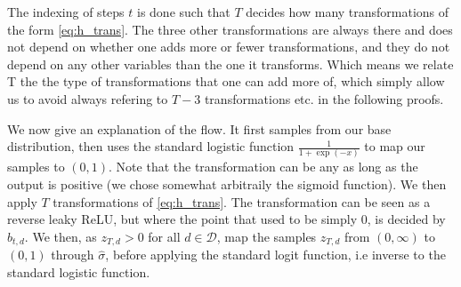 The indexing of steps \(t\) is done such
that \(T\) decides how many transformations of the form \cref{eq:h_trans}. The three other transformations are always there and does not depend 
on whether one adds more or fewer transformations,
and they do not depend on any other variables than the one it transforms. Which means we relate T the the type of transformations that one can
add more of, which simply allow us to avoid always refering to \(T-3\) transformations etc. in the following proofs.

We now give an explanation of the flow. It first samples from our base distribution, then uses the standard logistic function 
\(\frac{1}{1+\exp(-x)}\) to map our samples to \((0,1)\). Note that the transformation can be any as long as
the output is positive (we chose somewhat arbitraily the sigmoid function). 
We then apply \(T\) transformations of \cref{eq:h_trans}. The transformation can be seen as a reverse
leaky ReLU, but where the point that used to be simply \(0\), is decided by \(b_{t,d}\). 
We then, as \(z_{T,d} > 0\) for all 
\(d \in \mathcal{D}\), map the samples \(z_{T,d}\) from \((0,\infty)\) to \((0,1)\) through \(\hat{\sigma}\), before applying 
the standard logit function, i.e inverse to the standard logistic function. 

